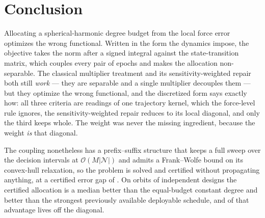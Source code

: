 \section{Conclusion}
\label{sec:conclusion}



Allocating a spherical-harmonic degree budget from the local force error
optimizes the wrong functional. Written in the form the dynamics impose, the
objective takes the norm after a signed integral against the state-transition
matrix, which couples every pair of epochs and makes the allocation
non-separable. The classical multiplier treatment and its sensitivity-weighted
repair both still \emph{work} --- they are separable and a single multiplier
decouples them --- but they optimize the wrong functional, and the discretized
form says exactly how: all three criteria are readings of one trajectory
kernel, which the force-level rule ignores, the sensitivity-weighted repair
reduces to its local diagonal, and only the third keeps whole. The weight was
never the missing ingredient, because the weight \emph{is} that diagonal.

The coupling nonetheless has a prefix--suffix structure that keeps a full sweep
over the decision intervals at $\mathcal{O}(M\lvert\mathcal{N}\rvert)$ and
admits a Frank--Wolfe bound on its convex-hull relaxation, so the problem is
solved and certified without propagating anything, at a certified error gap of
. On  orbits of  independent designs the certified
allocation is a median  better than the equal-budget constant degree
and  better than the strongest previously available deployable
schedule, and  of that advantage lives off the diagonal.

